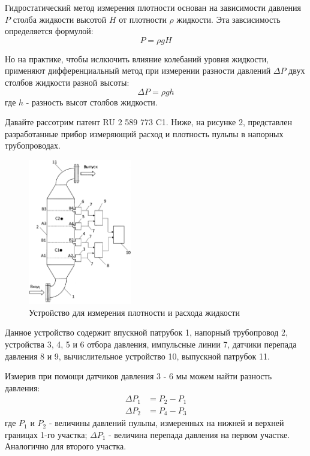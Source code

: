\documentclass[russian, utf8]{eskdtext}
\begin{document}
Гидростатический метод измерения плотности основан на зависимости давления $P$ столба жидкости высотой $H$ от плотности $\rho$ жидкости. Эта завсисимость определяется формулой:
\begin{equation}
	P = \rho g H
\end{equation}

Но на практике, чтобы ислкючить влияние колебаний уровня жидкости, применяют дифференциальный метод при измерении разности давлений $\Delta P$ двух столбов жидкости разной высоты: 
\begin{equation}
	\Delta P = \rho g h 
\end{equation}
где $h$ - разность высот столбов жидкости. \par

Давайте рассотрим патент RU 2 589 773 C1. Ниже, на рисунке 2, представлен разработанные прибор измеряющий расход и плотность пульпы в напорных трубопроводах. 

\begin{figure}[h!]
	\centering
	\includegraphics[width = 0.4\textwidth] {HydrostaticDensityMeter.png}
	\caption{Устройство для измерения плотности и расхода жидкости}
\end{figure}

\newpage
Данное устройство содержит впускной патрубок 1, напорный трубопровод 2, устройства 3, 4, 5 и 6 отбора давления, импульсные линии 7, датчики перепада давления 8 и 9, вычислительное устройство 10, выпускной патрубок 11. \par

Измерив при помощи датчиков давления 3 - 6 мы можем найти разность давления:
\begin{align}
	\Delta P_1 & = P_2 - P_1 \\
	\Delta P_2 & = P_4 - P_3
\end{align}
где $P_1$ и $P_2$ - величины давлений пульпы, измеренных на нижней и верхней границах 1-го участка; $\Delta P_1$ - величина перепада давления на первом участке. Аналогично для второго участка. \par
\end{document}
